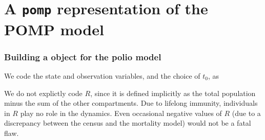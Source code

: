 \section{A \texttt{pomp} representation of the POMP model}

\begin{frame}[fragile]

\frametitle{Building a  object for the polio model}

\bi
\item
We code the state and observation variables, and the choice of $t_0$, as
\ei

\begin{knitrout}\small
{}\color{fgcolor}\begin{kframe}
\begin{alltt}
 \hlkwb{<-} \hlstd{(}\hlstd{,}\hlstd{,}\hlstd{,}\hlstd{,}\hlstd{,}\hlstd{,}
  \hlstd{,}\hlstd{,}\hlstd{)}
 \hlkwb{<-} 
 \hlkwb{<-} \hlopt{+}\hlopt{/}
\end{alltt}
\end{kframe}
\end{knitrout}
\bi
\item 
We do not explictly code $R$, since it is defined implicitly as the total population minus the sum of the other compartments. Due to lifelong immunity, individuals in $R$ play no role in the dynamics. Even occasional negative values of $R$ (due to a discrepancy between the census and the mortality model) would not be a fatal flaw.
\ei
\end{frame}


